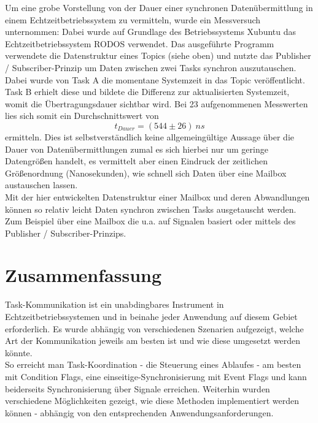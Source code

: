 \documentclass{llncs}
\begin{document}
Um eine grobe Vorstellung von der Dauer einer synchronen Datenübermittlung in einem Echtzeitbetriebssystem zu vermitteln, wurde ein Messversuch unternommen: Dabei wurde auf Grundlage des Betriebssystems Xubuntu das Echtzeitbetriebssystem RODOS \autocite{RODOS2017} verwendet. Das ausgeführte Programm verwendete die Datenstruktur eines Topics (siehe oben) und nutzte das Publisher / Subscriber-Prinzip um Daten zwischen zwei Tasks synchron auszutauschen. Dabei wurde von Task A die momentane Systemzeit in das Topic veröffentlicht. Task B erhielt diese und bildete die Differenz zur aktualisierten Systemzeit, womit die Übertragungsdauer sichtbar wird. Bei 23 aufgenommenen Messwerten lies sich somit ein Durchschnittswert von
\begin{equation}
t_{Dauer}=(544\pm26)~ns
\label{eq:SynchUebermittlungFehler}
\end{equation}
ermitteln. Dies ist selbstverständlich keine allgemeingültige Aussage über die Dauer von Datenübermittlungen zumal es sich hierbei nur um geringe Datengrößen handelt, es vermittelt aber einen Eindruck der zeitlichen Größenordnung (Nanosekunden), wie schnell sich Daten über eine Mailbox austauschen lassen.\\

Mit der hier entwickelten Datenstruktur einer Mailbox und deren Abwandlungen können so relativ leicht Daten synchron zwischen Tasks ausgetauscht werden. Zum Beispiel über eine Mailbox die u.a. auf Signalen basiert oder mittels des Publisher / Subscriber-Prinzips.

\section{Zusammenfassung}
Task-Kommunikation ist ein unabdingbares Instrument in Echtzeitbetriebssystemen und in beinahe jeder Anwendung auf diesem Gebiet erforderlich. Es wurde abhängig von verschiedenen Szenarien aufgezeigt, welche Art der Kommunikation jeweils am besten ist und wie diese umgesetzt werden könnte.\\

So erreicht man Task-Koordination - die Steuerung eines Ablaufes - am besten mit Condition Flags, eine einseitige-Synchronisierung mit Event Flags und kann beiderseits Synchronisierung über Signale erreichen. Weiterhin wurden verschiedene Möglichkeiten gezeigt, wie diese Methoden implementiert werden können - abhängig von den entsprechenden Anwendungsanforderungen.\\
\end{document}
